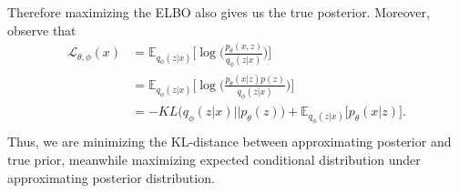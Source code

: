 \documentclass[12pt]{report}
\theoremstyle{definition}
\theoremstyle{remark}
\newcommand{\E}{\mathbb{E}}
\begin{document}
Therefore maximizing the ELBO also gives us the true posterior.
Moreover, observe that 
\begin{equation}
  \begin{split}
    \mathcal{L}_{\theta, \phi}(x) &= \E_{q_{\phi}(z|x)}\bigg[\log\Big( \frac{p_{\theta}(x,z)}{q_{\phi}(z|x)}\Big)\bigg]\\
    &= \E_{q_{\phi}(z|x)}\bigg[\log\Big( \frac{p_{\theta}(x|z)p(z)}{q_{\phi}(z|x)}\Big)\bigg]\\
    &= -KL\big(q_{\phi}(z|x) \big|\big| p_{\theta}(z)\big) + \E_{q_{\phi}(z|x)}\big[p_{\theta}(x|z)\big].\\
  \end{split}
\end{equation}
Thus, we are minimizing the KL-distance between approximating posterior and true prior, meanwhile maximizing expected conditional distribution under approximating posterior distribution. 
\end{document}

